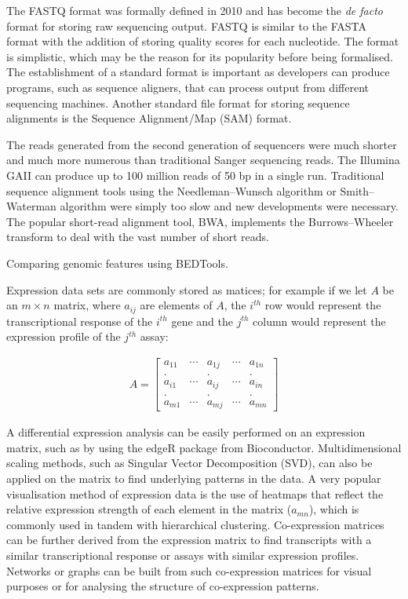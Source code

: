 The FASTQ format was formally defined in 2010\cite{pmid20015970} and has become the \textit{de facto} format for storing raw sequencing output. FASTQ is similar to the FASTA format with the addition of storing quality scores for each nucleotide. The format is simplistic, which may be the reason for its popularity before being formalised. The establishment of a standard format is important as developers can produce programs, such as sequence aligners, that can process output from different sequencing machines. Another standard file format for storing sequence alignments is the Sequence Alignment/Map (SAM) format\cite{pmid19505943}.

The reads generated from the second generation of sequencers were much shorter and much more numerous than traditional Sanger sequencing reads. The Illumina GAII can produce up to 100 million reads of 50 bp in a single run. Traditional sequence alignment tools using the Needleman–Wunsch algorithm or Smith–Waterman algorithm were simply too slow and new developments were necessary. The popular short-read alignment tool, BWA\cite{pmid19451168}, implements the Burrows–Wheeler transform to deal with the vast number of short reads.

Comparing genomic features using BEDTools\cite{pmid20110278}.

Expression data sets are commonly stored as matices; for example if we let $A$ be an $m \times n$ matrix, where $a_{ij}$ are elements of $A$, the $i^{th}$ row would represent the transcriptional response of the $i^{th}$ gene and the $j^{th}$ column would represent the expression profile of the $j^{th}$ assay:

\begin{align*}
   A = \begin{bmatrix} a_{11} & \cdots & a_{1j} & \cdots & a_{1n} \\
   . && . && . \\
   a_{i1} & \cdots & a_{ij} & \cdots & a_{in} \\
   . && . && . \\
   a_{m1} & \cdots & a_{mj} & \cdots & a_{mn} \end{bmatrix}
\end{align*}

A differential expression analysis can be easily performed on an expression matrix, such as by using the edgeR package\cite{pmid19910308} from Bioconductor\cite{pmid15461798}. Multidimensional scaling methods, such as Singular Vector Decomposition (SVD), can also be applied on the matrix to find underlying patterns in the data. A very popular visualisation method of expression data is the use of heatmaps that reflect the relative expression strength of each element in the matrix ($a_{mn}$), which is commonly used in tandem with hierarchical clustering. Co-expression matrices can be further derived from the expression matrix to find transcripts with a similar transcriptional response or assays with similar expression profiles. Networks or graphs can be built from such co-expression matrices for visual purposes or for analysing the structure of co-expression patterns.

